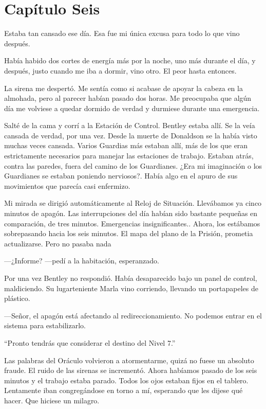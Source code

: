 \chapter*{Capítulo Seis}

Estaba tan cansado ese día. Esa fue mi única excusa para todo lo que
vino después.

Había habido dos cortes de energía más por la noche, uno más durante el
día, y después, justo cuando me iba a dormir, vino otro. El peor hasta
entonces.

La sirena me despertó. Me sentía como si acabase de apoyar la cabeza en
la almohada, pero al parecer habían pasado dos horas. Me preocupaba que
algún día me volviese a quedar dormido de verdad y durmiese durante una
emergencia.

Salté de la cama y corrí a la Estación de Control. Bentley estaba allí.
Se la veía cansada de verdad, por una vez. Desde la muerte de Donaldson
se la había visto muchas veces cansada. Varios Guardias más estaban
allí, más de los que eran estrictamente necesarios para manejar las
estaciones de trabajo. Estaban atrás, contra las paredes, fuera del
camino de los Guardianes. ¿Era mi imaginación o los Guardianes se
estaban poniendo nerviosos?. Había algo en el apuro de sus movimientos
que parecía casi enfermizo.

Mi mirada se dirigió automáticamente al Reloj de Situación. Llevábamos
ya cinco minutos de apagón. Las interrupciones del día habían sido
bastante pequeñas en comparación, de tres minutos. Emergencias
insignificantes.. Ahora, los estábamos sobrepasando hacia los seis
minutos. El mapa del plano de la Prisión, prometia actualizarse. Pero no
pasaba nada

---¿Informe? ---pedí a la habitación, esperanzado.

Por una vez Bentley no respondió. Había desaparecido bajo un panel de
control, maldiciendo. Su lugarteniente Marla vino corriendo, llevando un
portapapeles de plástico.

---Señor, el apagón está afectando al redireccionamiento. No podemos
entrar en el sistema para estabilizarlo.

``Pronto tendrás que considerar el destino del Nivel 7.''

Las palabras del Oráculo volvieron a atormentarme, quizá no fuese un
absoluto fraude. El ruido de las sirenas se incrementó. Ahora habíamos
pasado de los seis minutos y el trabajo estaba parado. Todos los ojos
estaban fijos en el tablero. Lentamente iban congregándose en torno a
mí, esperando que les dijese qué hacer. Que hiciese un milagro.

